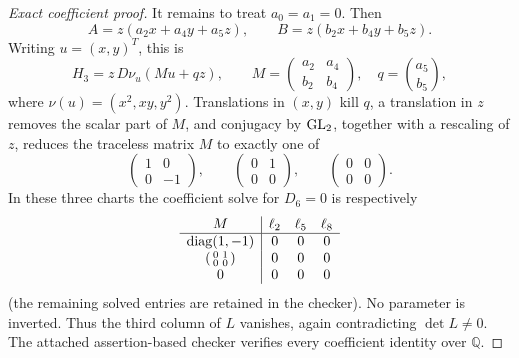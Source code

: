 \begin{proof}[Exact coefficient proof]
It remains to treat \(a_0=a_1=0\).  Then
\[
 A=z(a_2x+a_4y+a_5z),\qquad
 B=z(b_2x+b_4y+b_5z).
\]
Writing \(u=(x,y)^T\), this is
\[
 H_3=z\,D\nu_u(Mu+qz),
 \qquad
 M=\begin{pmatrix}a_2&a_4\\b_2&b_4\end{pmatrix},
 \quad q=\binom{a_5}{b_5},
\]
where \(\nu(u)=(x^2,xy,y^2)\).  Translations in \((x,y)\) kill \(q\), a
translation in \(z\) removes the scalar part of \(M\), and conjugacy by
\(\operatorname{GL}_2\), together with a rescaling of \(z\), reduces the traceless matrix
\(M\) to exactly one of
\[
 \begin{pmatrix}1&0\\0&-1\end{pmatrix},\qquad
 \begin{pmatrix}0&1\\0&0\end{pmatrix},\qquad
 \begin{pmatrix}0&0\\0&0\end{pmatrix}.
\]
In these three charts the coefficient solve for \(D_6=0\) is respectively
\[
\begin{array}{c|ccc}
M&\ell_2&\ell_5&\ell_8\\ \hline
\operatorname{diag}(1,-1)&0&0&0\\
\begin{psmallmatrix}0&1\\0&0\end{psmallmatrix}&0&0&0\\
0&0&0&0
\end{array}
\]
(the remaining solved entries are retained in the checker).  No parameter is
inverted.  Thus the third column of \(L\) vanishes, again contradicting
\(\det L\ne0\).  The attached assertion-based checker verifies every
coefficient identity over \(\mathbb Q\).
\end{proof}
